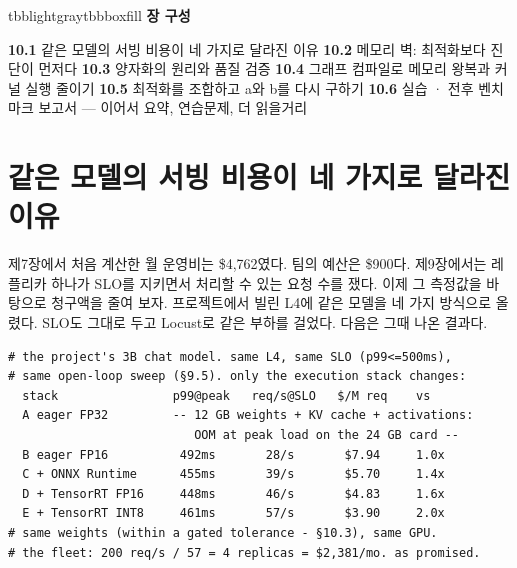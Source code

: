 \vspace{3.5pt}

\begin{calloutbox}{tbblightgray}{tbbboxfill}
{\normalsize\bfseries\color{tbbink}장 구성}\par\vspace{3pt}
\textbf{10.1} 같은 모델의 서빙 비용이 네 가지로 달라진 이유    \textbf{10.2} 메모리 벽: 최적화보다 진단이 먼저다    \textbf{10.3} 양자화의 원리와 품질 검증    \textbf{10.4} 그래프 컴파일로 메모리 왕복과 커널 실행 줄이기    \textbf{10.5} 최적화를 조합하고 a와 b를 다시 구하기    \textbf{10.6} 실습 · 전후 벤치마크 보고서 — 이어서 요약, 연습문제, 더 읽을거리
\end{calloutbox}

\section{같은 모델의 서빙 비용이 네 가지로 달라진 이유}

제7장에서 처음 계산한 월 운영비는 \$4,762였다. 팀의 예산은 \$900다. 제9장에서는 레플리카 하나가 SLO를 지키면서 처리할 수 있는 요청 수를 쟀다. 이제 그 측정값을 바탕으로 청구액을 줄여 보자. 프로젝트에서 빌린 L4에 같은 모델을 네 가지 방식으로 올렸다. SLO도 그대로 두고 Locust로 같은 부하를 걸었다. 다음은 그때 나온 결과다.

\begin{terminalbox}
\begin{Verbatim}[breaklines=true,breakanywhere=true,fontsize=\small,formatcom=\color{tbbtermfg},codes=\tbbcodeactive]
# the project's 3B chat model. same L4, same SLO (p99<=500ms),
# same open-loop sweep (§9.5). only the execution stack changes:
  stack                p99@peak   req/s@SLO   $/M req    vs
  A eager FP32         -- 12 GB weights + KV cache + activations:
                          OOM at peak load on the 24 GB card --
  B eager FP16          492ms       28/s       $7.94     1.0x
  C + ONNX Runtime      455ms       39/s       $5.70     1.4x
  D + TensorRT FP16     448ms       46/s       $4.83     1.6x
  E + TensorRT INT8     461ms       57/s       $3.90     2.0x
# same weights (within a gated tolerance - §10.3), same GPU.
# the fleet: 200 req/s / 57 = 4 replicas = $2,381/mo. as promised.
\end{Verbatim}
\end{terminalbox}

